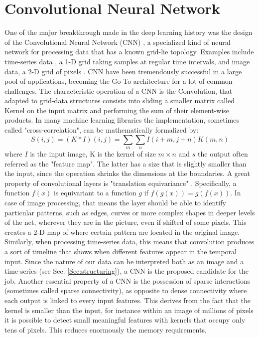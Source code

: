 \documentclass[binding=0.7cm, oneside]{sapthesis}
\begin{document}
\section{Convolutional Neural Network}
One of the major breakthrough made in the deep learning history was the design of the Convolutional Neural Network (CNN) \cite{LeCun_CNN}, a specialized kind of neural network for
processing data that has a known grid-lie topology. Examples include time-series data \cite{time_conv,EEG_conv}, a 1-D grid taking samples at regular time intervals, and image data, a 2-D grid of pixels \cite{cnn_segment,class_cnn}.
CNN have been tremendously successful in a large pool of applications, becoming the Go-To architecture for a lot of common challenges. The characteristic operation of a CNN is the
Convolution, that adapted to grid-data structures consists into sliding a smaller matrix called Kernel on the input matrix and performing the sum of their element-wise products.
In many machine learning libraries the implementation, sometimes called "cross-correlation", can be mathematically formalized by:
$$S(i,j) = (K \ast I)(i,j) = \sum_{m}\sum_{n}I(i + m,j + n)K(m,n)$$
where $I$ is the input image, K is the kernel of size $m \times n$ and $s$ the output often referred as the "feature map". The latter has a size that is slightly smaller than the input,
since the operation shrinks the dimensions at the boundaries. A great property of convolutional layers is "translation equivariance" \cite{Goodfellow_DL}. Specifically,
a function $f(x)$ is equivariant to a function $g$ if $f(g(x)) = g(f(x))$. In case of image processing, that means the layer should be able to identify particular patterns,
such as edges, curves or more complex shapes in deeper levels of the net, wherever they are in the picture, even if shifted of some pixels.
This creates a 2-D map of where certain pattern are located in the original image. Similarly, when processing time-series data, this means that convolution produces a sort
of timeline that shows when different features appear in the temporal input. Since the nature of our data can be interpreted both as an image and a time-series (see Sec. \ref{Sec:structuring}),
a CNN is the proposed candidate for the job.
Another essential property of a CNN is the possession of sparse interactions (sometimes called sparse connectivity), as opposite to dense connectivity where each output is linked to every input features. This derives from the fact that the kernel is smaller than the input, for
instance within an image of millions of pixels it is possible to detect small meaningful features with kernels that occupy only tens of pixels. This reduces enormously the memory requirements,
\end{document}
